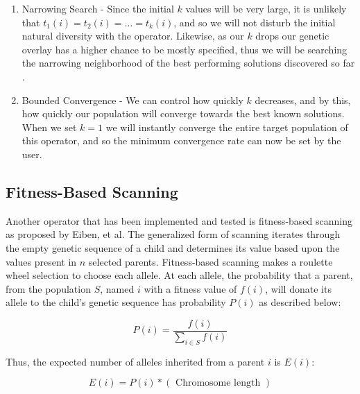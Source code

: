 \begin{enumerate}

\item Narrowing Search - Since the initial $k$ values will be very large, it is unlikely that $t_1(i) = t_2(i) = \ldots = t_k(i)$, and so we will not disturb the initial natural diversity with the operator.  Likewise, as our $k$ drops our genetic overlay has a higher chance to be mostly specified, thus we will be searching the narrowing neighborhood of the best performing solutions discovered so far \cite{Neri11}.

\item Bounded Convergence - We can control how quickly $k$ decreases, and by this, how quickly our population will converge towards the best known solutions. When we set $k=1$ we will instantly converge the entire target population of this operator, and so the minimum convergence rate can now be set by the user.

\end{enumerate}

\subsection*{Fitness-Based Scanning}
Another operator that has been implemented and tested is fitness-based scanning as proposed by Eiben, et al\cite{Eiben94}. The generalized form of scanning iterates through the empty genetic sequence of a child and determines its value based upon the values present in $n$ selected parents\cite{Eiben91}. Fitness-based scanning makes a roulette wheel selection to choose each allele. At each allele, the probability that a parent, from the population $S$, named $i$ with a fitness value of $f(i)$, will donate its allele to the child's genetic sequence has probability $P(i)$ as described below\cite{Eiben94}: 

\[ P(i) = \frac{f(i)}{\sum\limits_{i \in S} f(i)} \]

\noindent Thus, the expected number of alleles inherited from a parent $i$ is $E(i)$\cite{Eiben94}:

\[ E(i) = P(i) *(\text{ Chromosome length }) \]

